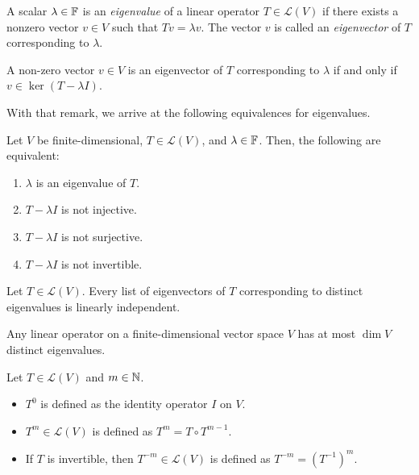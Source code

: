 \documentclass{article}
\begin{document}
\begin{definition}
  A scalar $\lambda \in \mathbb{F}$ is an \emph{eigenvalue} of a linear operator $T \in \mathcal{L}(V)$ if there exists a nonzero vector $v \in V$ such that $Tv = \lambda v$.
  The vector $v$ is called an \emph{eigenvector} of $T$ corresponding to $\lambda$.
\end{definition}

\begin{remark}
  A non-zero vector $v \in V$ is an eigenvector of $T$ corresponding to $\lambda$ if and only if $v \in \ker (T - \lambda I)$.
\end{remark}

With that remark, we arrive at the following equivalences for eigenvalues.

\begin{theorem}
  Let $V$ be finite-dimensional, $T \in \mathcal{L}(V)$, and $\lambda \in \mathbb{F}$.
  Then, the following are equivalent:
  \begin{enumerate}
    \item $\lambda$ is an eigenvalue of $T$.
    \item $T - \lambda I$ is not injective.
    \item $T - \lambda I$ is not surjective.
    \item $T - \lambda I$ is not invertible.
  \end{enumerate}
\end{theorem}

\begin{theorem}
  Let $T \in \mathcal{L}(V)$.
  Every list of eigenvectors of $T$ corresponding to distinct eigenvalues is linearly independent.
\end{theorem}

\begin{theorem}
  Any linear operator on a finite-dimensional vector space $V$ has at most $\dim V$ distinct eigenvalues.
\end{theorem}

\begin{definition}[$T^m$]
  Let $T \in \mathcal{L}(V)$ and $m \in \mathbb{N}$.
  \begin{itemize}
    \item $T^0$ is defined as the identity operator $I$ on $V$.
    \item $T^m \in \mathcal{L}(V)$ is defined as $T^m = T \circ T^{m - 1}$.
    \item If $T$ is invertible, then $T^{-m} \in \mathcal{L}(V)$ is defined as $T^{-m} = (T^{-1})^m$.
  \end{itemize}
\end{definition}
\end{document}
